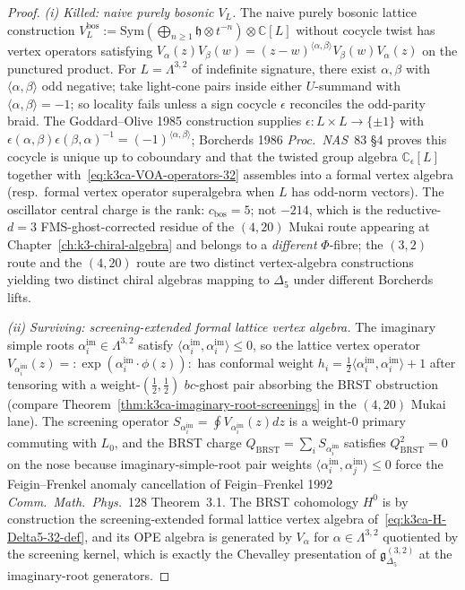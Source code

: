 \begin{proof}
\emph{(i) Killed: naive purely bosonic $V_L$.}
The naive purely bosonic lattice construction
$V_L^{\mathrm{bos}} := \mathrm{Sym}(\bigoplus_{n\geq 1}\mathfrak h\otimes t^{-n})\otimes\mathbb C[L]$
without cocycle twist has vertex operators satisfying
$V_\alpha(z)V_\beta(w) = (z-w)^{\langle\alpha,\beta\rangle}V_\beta(w)V_\alpha(z)$
on the punctured product. For $L = \Lambda^{3,2}$ of indefinite
signature, there exist $\alpha,\beta$ with $\langle\alpha,\beta\rangle$
odd negative; take light-cone pairs inside either $U$-summand
with $\langle\alpha,\beta\rangle=-1$; so locality fails
unless a sign cocycle $\epsilon$ reconciles the odd-parity braid.
The Goddard--Olive 1985 construction supplies
$\epsilon:L\times L\to\{\pm 1\}$ with
$\epsilon(\alpha,\beta)\epsilon(\beta,\alpha)^{-1} = (-1)^{\langle\alpha,\beta\rangle}$;
Borcherds 1986 \emph{Proc.\ NAS}~83 \S4 proves this cocycle is
unique up to coboundary and that the twisted group algebra
$\mathbb C_\epsilon[L]$ together with~\eqref{eq:k3ca-VOA-operators-32}
assembles into a formal vertex algebra (resp.\ formal vertex operator
superalgebra when $L$ has odd-norm vectors). The oscillator central charge is the rank:
$c_{\mathrm{bos}} = 5$; not $-214$, which is the reductive-$d=3$
FMS-ghost-corrected residue of the $(4,20)$ Mukai route appearing
at Chapter~\ref{ch:k3-chiral-algebra} and belongs to a
\emph{different} $\Phi$-fibre; the $(3,2)$ route and the $(4,20)$
route are two distinct vertex-algebra constructions yielding two distinct
chiral algebras mapping to $\Delta_5$ under different Borcherds
lifts.

\emph{(ii) Surviving: screening-extended formal lattice vertex algebra.}
The imaginary simple roots $\alpha_i^{\mathrm{im}}\in\Lambda^{3,2}$
satisfy $\langle\alpha_i^{\mathrm{im}},\alpha_i^{\mathrm{im}}\rangle\leq 0$,
so the lattice vertex operator
$V_{\alpha_i^{\mathrm{im}}}(z) = {:}\exp(\alpha_i^{\mathrm{im}}\cdot\phi(z)){:}$
has conformal weight
$h_i = \tfrac{1}{2}\langle\alpha_i^{\mathrm{im}},\alpha_i^{\mathrm{im}}\rangle + 1$
after tensoring with a weight-$(\tfrac{1}{2},\tfrac{1}{2})$ $bc$-ghost
pair absorbing the BRST obstruction (compare
Theorem~\ref{thm:k3ca-imaginary-root-screenings} in the $(4,20)$
Mukai lane). The screening operator
$S_{\alpha_i^{\mathrm{im}}} = \oint V_{\alpha_i^{\mathrm{im}}}(z)dz$
is a weight-$0$ primary commuting with $L_0$, and the BRST charge
$Q_{\mathrm{BRST}} = \sum_i S_{\alpha_i^{\mathrm{im}}}$ satisfies
$Q_{\mathrm{BRST}}^2 = 0$ on the nose because imaginary-simple-root
pair weights $\langle\alpha_i^{\mathrm{im}},\alpha_j^{\mathrm{im}}\rangle\leq 0$
force the Feigin--Frenkel anomaly cancellation of
Feigin--Frenkel 1992 \emph{Comm.\ Math.\ Phys.}~128 Theorem~3.1.
The BRST cohomology $H^0$ is by construction the
screening-extended formal lattice vertex algebra of~\eqref{eq:k3ca-H-Delta5-32-def},
and its OPE algebra is generated by $V_\alpha$ for
$\alpha\in\Lambda^{3,2}$ quotiented by the screening kernel, which
is exactly the Chevalley presentation of
$\mathfrak g_{\Delta_5}^{(3,2)}$ at the imaginary-root generators.


\end{proof}
